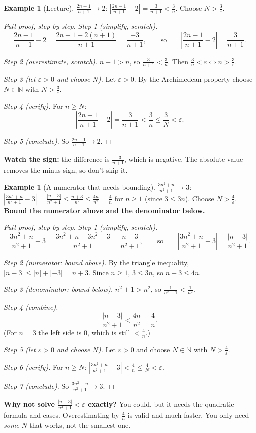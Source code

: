 \documentclass[11pt]{article}
\theoremstyle{definition}
\newtheorem{ex}[defn]{Example}
\newcommand{\N}{\mathbb{N}}
\newcommand{\eps}{\varepsilon}
\newcommand{\key}[1]{\textcolor{red!70!black}{\textbf{#1}}}
\begin{document}
\begin{ex}[Lecture]
$\frac{2n-1}{n+1}\to2$: $\left|\frac{2n-1}{n+1}-2\right|=\frac{3}{n+1}<\frac3n$.
Choose $N>\frac3\eps$.

\begin{proof}[Full proof, step by step]
\emph{Step 1 (simplify, scratch).}
\[
\frac{2n-1}{n+1}-2=\frac{2n-1-2(n+1)}{n+1}=\frac{-3}{n+1},
\qquad\text{so}\qquad
\left|\frac{2n-1}{n+1}-2\right|=\frac3{n+1}.
\]

\emph{Step 2 (overestimate, scratch).} $n+1>n$, so $\frac3{n+1}<\frac3n$.
Then $\frac3n<\eps\iff n>\frac3\eps$.

\emph{Step 3 (let $\eps>0$ and choose $N$).} Let $\eps>0$. By the
Archimedean property choose $N\in\N$ with $N>\frac3\eps$.

\emph{Step 4 (verify).} For $n\ge N$:
\[
\left|\frac{2n-1}{n+1}-2\right|=\frac3{n+1}<\frac3n\le\frac3N<\eps.
\]

\emph{Step 5 (conclude).} So $\frac{2n-1}{n+1}\to2$.
\end{proof}
\noindent\key{Watch the sign:} the difference is $\frac{-3}{n+1}$, which
is negative. The absolute value removes the minus sign, so don't skip it.
\end{ex}

\begin{ex}[A numerator that needs bounding]
$\frac{3n^2+n}{n^2+1}\to3$:
$\left|\frac{3n^2+n}{n^2+1}-3\right|=\frac{|n-3|}{n^2+1}\le\frac{n+3}{n^2}\le\frac{4n}{n^2}=\frac4n$
for $n\ge1$ (since $3\le 3n$). Choose $N>\frac4\eps$.
\key{Bound the numerator above and the denominator below.}

\begin{proof}[Full proof, step by step]
\emph{Step 1 (simplify, scratch).}
\[
\frac{3n^2+n}{n^2+1}-3=\frac{3n^2+n-3n^2-3}{n^2+1}=\frac{n-3}{n^2+1},
\qquad\text{so}\qquad
\left|\frac{3n^2+n}{n^2+1}-3\right|=\frac{|n-3|}{n^2+1}.
\]

\emph{Step 2 (numerator: bound above).} By the triangle inequality,
$|n-3|\le|n|+|-3|=n+3$. Since $n\ge1$, $3\le3n$, so $n+3\le4n$.

\emph{Step 3 (denominator: bound below).} $n^2+1>n^2$, so
$\frac1{n^2+1}<\frac1{n^2}$.

\emph{Step 4 (combine).}
\[
\frac{|n-3|}{n^2+1}<\frac{4n}{n^2}=\frac4n.
\]
(For $n=3$ the left side is $0$, which is still $<\frac4n$.)

\emph{Step 5 (let $\eps>0$ and choose $N$).} Let $\eps>0$ and choose
$N\in\N$ with $N>\frac4\eps$.

\emph{Step 6 (verify).} For $n\ge N$:
$\left|\frac{3n^2+n}{n^2+1}-3\right|<\frac4n\le\frac4N<\eps$.

\emph{Step 7 (conclude).} So $\frac{3n^2+n}{n^2+1}\to3$.
\end{proof}
\noindent\key{Why not solve $\frac{|n-3|}{n^2+1}<\eps$ exactly?} You could,
but it needs the quadratic formula and cases. Overestimating by $\frac4n$
is valid and much faster. You only need \emph{some} $N$ that works, not
the smallest one.
\end{ex}
\end{document}
